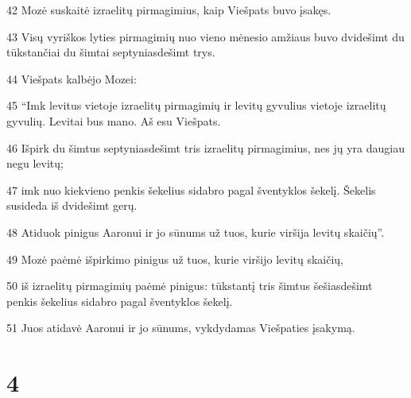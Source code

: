 \par 42 Mozė suskaitė izraelitų pirmagimius, kaip Viešpats buvo įsakęs. 
\par 43 Visų vyriškos lyties pirmagimių nuo vieno mėnesio amžiaus buvo dvidešimt du tūkstančiai du šimtai septyniasdešimt trys. 
\par 44 Viešpats kalbėjo Mozei: 
\par 45 “Imk levitus vietoje izraelitų pirmagimių ir levitų gyvulius vietoje izraelitų gyvulių. Levitai bus mano. Aš esu Viešpats. 
\par 46 Išpirk du šimtus septyniasdešimt tris izraelitų pirmagimius, nes jų yra daugiau negu levitų; 
\par 47 imk nuo kiekvieno penkis šekelius sidabro pagal šventyklos šekelį. Šekelis susideda iš dvidešimt gerų. 
\par 48 Atiduok pinigus Aaronui ir jo sūnums už tuos, kurie viršija levitų skaičių”. 
\par 49 Mozė paėmė išpirkimo pinigus už tuos, kurie viršijo levitų skaičių, 
\par 50 iš izraelitų pirmagimių paėmė pinigus: tūkstantį tris šimtus šešiasdešimt penkis šekelius sidabro pagal šventyklos šekelį. 
\par 51 Juos atidavė Aaronui ir jo sūnums, vykdydamas Viešpaties įsakymą.



\chapter{4}


